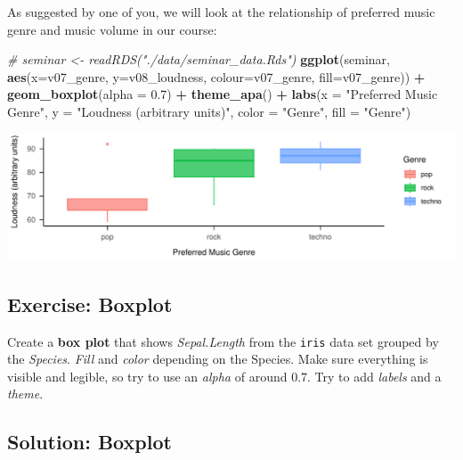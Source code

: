 \documentclass[
]{book}
\newenvironment{Shaded}{\begin{snugshade}}{\end{snugshade}}
\newcommand{\AttributeTok}[1]{\textcolor[rgb]{0.13,0.29,0.53}{#1}}
\newcommand{\CommentTok}[1]{\textcolor[rgb]{0.56,0.35,0.01}{\textit{#1}}}
\newcommand{\FloatTok}[1]{\textcolor[rgb]{0.00,0.00,0.81}{#1}}
\newcommand{\FunctionTok}[1]{\textcolor[rgb]{0.13,0.29,0.53}{\textbf{#1}}}
\newcommand{\NormalTok}[1]{#1}
\newcommand{\SpecialCharTok}[1]{\textcolor[rgb]{0.81,0.36,0.00}{\textbf{#1}}}
\newcommand{\StringTok}[1]{\textcolor[rgb]{0.31,0.60,0.02}{#1}}
\begin{document}
As suggested by one of you, we will look at the relationship of preferred music genre and music volume in our course:

\begin{Shaded}
\begin{Highlighting}[]
\CommentTok{\# seminar \textless{}{-} readRDS("./data/seminar\_data.Rds")}
\FunctionTok{ggplot}\NormalTok{(seminar, }\FunctionTok{aes}\NormalTok{(}\AttributeTok{x=}\NormalTok{v07\_genre, }\AttributeTok{y=}\NormalTok{v08\_loudness, }\AttributeTok{colour=}\NormalTok{v07\_genre, }\AttributeTok{fill=}\NormalTok{v07\_genre)) }\SpecialCharTok{+}
  \FunctionTok{geom\_boxplot}\NormalTok{(}\AttributeTok{alpha =} \FloatTok{0.7}\NormalTok{) }\SpecialCharTok{+} \FunctionTok{theme\_apa}\NormalTok{() }\SpecialCharTok{+}
  \FunctionTok{labs}\NormalTok{(}\AttributeTok{x =} \StringTok{"Preferred Music Genre"}\NormalTok{, }\AttributeTok{y =} \StringTok{"Loudness (arbitrary units)"}\NormalTok{, }
       \AttributeTok{color =} \StringTok{"Genre"}\NormalTok{, }\AttributeTok{fill =} \StringTok{"Genre"}\NormalTok{)}
\end{Highlighting}
\end{Shaded}

\includegraphics{_main_files/figure-latex/unnamed-chunk-55-1.pdf}

\subsection{Exercise: Boxplot}\label{exercise-boxplot}

Create a \textbf{box plot} that shows \emph{Sepal.Length} from the \texttt{iris} data set grouped by the \emph{Species}.
\emph{Fill} and \emph{color} depending on the Species.
Make sure everything is visible and legible, so try to use an \emph{alpha} of around 0.7.
Try to add \emph{labels} and a \emph{theme}.

\subsection{Solution: Boxplot}\label{solution-boxplot}
\end{document}
